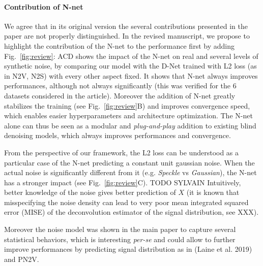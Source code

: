 \documentclass{article}
\begin{document}
\paragraph{Contribution of N-net}
We agree that in its original version the several contributions presented in the paper are not properly distinguished.
In the revised manuscript, we propose to highlight the contribution of the N-net to the performance first by adding Fig.~\ref{fig:review}: ACD shows the impact of the N-net on real and several levels of synthetic noise, by comparing our model with the D-Net trained with L2 loss (as in N2V, N2S) with every other aspect fixed.
It shows that N-net always improves performances, although not always significantly (this was verified for the 6 datasets considered in the article). Moreover the addition of N-net greatly stabilizes the training (see Fig.~\ref{fig:review}B) and improves convergence speed, which enables easier hyperparameters and architecture optimization.
The N-net alone can thus be seen as a modular and \textit{plug-and-play} addition to existing blind denoising models, which always improves performances and convergence.

From the perspective of our framework, the L2 loss can be understood as a particular case of the N-net predicting a constant unit gaussian noise. When the actual noise is significantly different from it (e.g. \textit{Speckle} vs \textit{Gaussian}), the N-net has a stronger impact (see Fig.~\ref{fig:review}C).
TODO SYLVAIN  Intuitively, better knowledge of the noise gives better prediction of $X$ (it is known that misspecifying the noise density can lead to very poor mean integrated squared error (MISE) of the deconvolution estimator of the signal distribution, see XXX).

Moreover the noise model was shown in the main paper to capture several statistical behaviors, which is interesting \textit{per-se} and could allow to further improve performances by predicting signal distribution as in (Laine et al. 2019) and PN2V.
\end{document}
